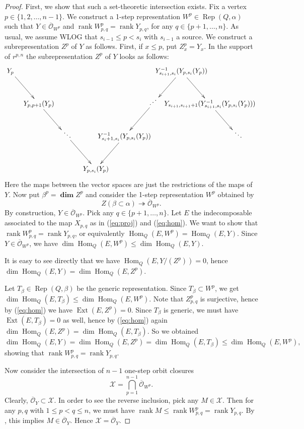 \documentclass[twoside]{article}
\newcommand{\orb}{\mathcal{O}}
\newcommand{\ove}{\overline}
\DeclareMathOperator{\Dim}{\mathbf{dim}}
\newcommand{\Hom}{\operatorname{Hom}}
\newcommand{\Ext}{\operatorname{Ext}}
\newcommand{\Rep}{\operatorname{Rep}}
\newcommand{\rank}{\operatorname{rank}}
\theoremstyle{definition}
\begin{document}
\begin{proof}
First, we show that such a set-theoretic intersection exists. Fix a vertex $p\in \{1,2,\dots, n-1\}$. We construct a 1-step representation $W^p \in \Rep(Q,\alpha)$ such that $Y \in \ove{\orb}_{W^p}$ and $\rank W^p_{p,q} = \rank Y_{p,q}$, for any $q \in \{p+1, \dots , n\}$. As usual, we assume WLOG that $s_{i-1}\leq p < s_i$ with $s_{i-1}$ a source. We construct a subrepresentation $Z^p$ of $Y$ as follows. First, if $x\leq p$, put $Z^p_x=Y_x$. In the support of $r^{p,n}$ the subrepresentation $Z^p$ of $Y$ looks as follows: 
\[\xymatrix@!0@C=3.5pc@R=4pc{
Y_p \ar[dr] &  & & & & & Y^{-1}_{s_{i+1},s_i}(Y_{p,s_i}(Y_p))\ar[dl] \ar[dr] & &\\
      & Y_{p,p+1}(Y_p) \ar[dr] & & &  & \iddots \ar[dl] & & Y_{s_{i+1},s_{i+1}+1}(Y^{-1}_{s_{i+1},s_i}(Y_{p,s_i}(Y_p))) \ar[dr] &\\
      & & \ddots\ar[dr] & & Y^{-1}_{s_i+1,s_i}(Y_{p,s_i}(Y_p))\ar[dl] & & & & \ddots\\
      & & & Y_{p,s_i}(Y_p) & & & & &
}\]
Here the maps between the vector spaces are just the restrictions of the maps of $Y$. Now put $\beta^p = \Dim Z^p$ and consider the 1-step representation $W^p$ obtained by
\[ Z(\beta \subset \alpha) \twoheadrightarrow \ove{\orb}_{W^p}.\]
By construction, $Y\in  \ove{\orb}_{W^p}$. Pick any $q \in \{p+1, \dots , n\}$. Let $E$ the indecomposable associated to the map $X_{p,q}$ as in (\ref{eq:proj}) and (\ref{eq:hom}).  We want to show that $\rank W^p_{p,q} = \rank Y_{p,q}$, or equivalently $\Hom_Q(E, W^p) = \Hom_Q(E,Y)$. Since  $Y\in  \ove{\orb}_{W^p}$, we have  $\dim \Hom_Q(E, W^p) \leq \dim \Hom_Q(E,Y)$.

It is easy to see directly that we have $\Hom_Q(E,Y/(Z^p))=0$, hence $\dim \Hom_Q(E,Y)=\dim \Hom_Q(E,Z^p)$.

Let $T_\beta\in \Rep(Q,\beta)$ be the generic representation. Since $T_\beta \subset W^p$, we get $\dim \Hom_Q(E,T_\beta)\! \leq \dim \Hom_Q(E, W^p)$. 
Note that $Z_{p,q}^p$ is surjective, hence by (\ref{eq:hom}) we have $\Ext(E,Z^p)=0$. Since $T_\beta$ is generic, we must have $\Ext(E,T_\beta)=0$ as well, hence by (\ref{eq:hom}) again $\dim \Hom_Q(E,Z^p) = \dim \Hom_Q(E,T_\beta)$. So we obtained
\[\dim \Hom_Q(E,Y) = \dim \Hom_Q(E,Z^p) = \dim \Hom_Q(E,T_\beta) \leq \dim \Hom_Q(E,W^p),\]
showing that $\rank W^p_{p,q} = \rank Y_{p,q}$.

Now consider the intersection of $n-1$ one-step orbit closures
\[\mathcal{X}=\bigcap_{p=1}^{n-1} \ove{\orb}_{W^p}.\]
Clearly, $\ove{\orb}_Y \subset \mathcal{X}$. In order to see the reverse inclusion, pick any $M \in \mathcal{X}$. Then for any $p,q$ with $1\leq p<q \leq n$, we must have $\rank M \leq \rank W^p_{p,q} = \rank Y_{p,q}$. By \cite{abeasis2}, this implies $M\in \ove{\orb}_Y$. Hence $\mathcal{X}=\ove{\orb}_Y$.


\end{proof}
\end{document}
